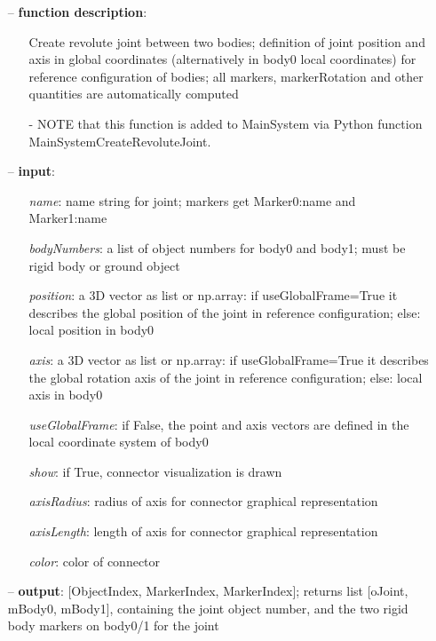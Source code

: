 \begin{itemize}[leftmargin=0.7cm]
\item[--]
{\bf function description}: \vspace{-6pt}
\begin{itemize}[leftmargin=1.2cm]
\setlength{\itemindent}{-0.7cm}
\item[]Create revolute joint between two bodies; definition of joint position and axis in global coordinates (alternatively in body0 local coordinates) for reference configuration of bodies; all markers, markerRotation and other quantities are automatically computed
\item[]- NOTE that this function is added to MainSystem via Python function MainSystemCreateRevoluteJoint.
\end{itemize}
\item[--]
{\bf input}: \vspace{-6pt}
\begin{itemize}[leftmargin=1.2cm]
\setlength{\itemindent}{-0.7cm}
\item[]{\it name}: name string for joint; markers get Marker0:name and Marker1:name
\item[]{\it bodyNumbers}: a list of object numbers for body0 and body1; must be rigid body or ground object
\item[]{\it position}: a 3D vector as list or np.array: if useGlobalFrame=True it describes the global position of the joint in reference configuration; else: local position in body0
\item[]{\it axis}: a 3D vector as list or np.array: if  useGlobalFrame=True it describes the global rotation axis of the joint in reference configuration; else: local axis in body0
\item[]{\it useGlobalFrame}: if False, the point and axis vectors are defined in the local coordinate system of body0
\item[]{\it show}: if True, connector visualization is drawn
\item[]{\it axisRadius}: radius of axis for connector graphical representation
\item[]{\it axisLength}: length of axis for connector graphical representation
\item[]{\it color}: color of connector
\end{itemize}
\item[--]
{\bf output}: [ObjectIndex, MarkerIndex, MarkerIndex]; returns list [oJoint, mBody0, mBody1], containing the joint object number, and the two rigid body markers on body0/1 for the joint
\vspace{12pt}\end{itemize}
%

